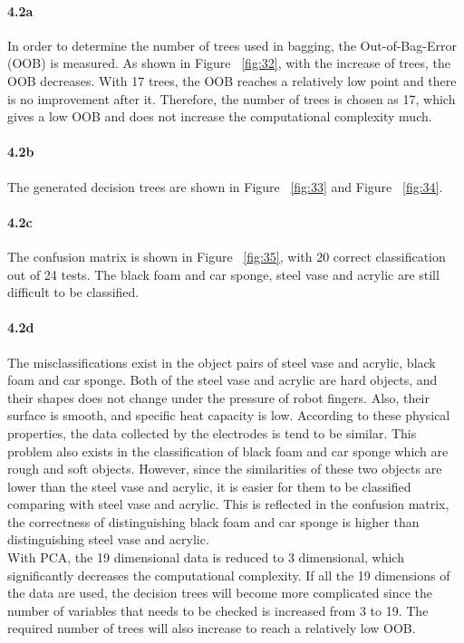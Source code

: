 \documentclass[10pt,twocolumn,letterpaper]{article}
\begin{document}
\paragraph{4.2a}
In order to determine the number of trees used in bagging, the Out-of-Bag-Error (OOB) is measured. As shown in Figure ~\ref{fig:32}, with the increase of trees, the OOB decreases. With 17 trees, the OOB reaches a relatively low point and there is no improvement after it. Therefore, the number of trees is chosen as 17, which gives a low OOB and does not increase the computational complexity much.

\paragraph{4.2b}
The generated decision trees are shown in Figure ~\ref{fig:33} and Figure ~\ref{fig:34}.

\paragraph{4.2c}
The confusion matrix is shown in Figure ~\ref{fig:35}, with 20 correct classification out of 24 tests. The black foam and car sponge, steel vase and acrylic are still difficult to be classified.

\paragraph{4.2d} The misclassifications exist in the object pairs of steel vase and acrylic, black foam and car sponge. Both of the steel vase and acrylic are hard objects, and their shapes does not change under the pressure of robot fingers. Also, their surface is smooth, and specific heat capacity is low. According to these physical properties, the data collected by the electrodes is tend to be similar. This problem also exists in the classification of black foam and car sponge which are rough and soft objects. However, since the similarities of these two objects are lower than the steel vase and acrylic, it is easier for them to be classified comparing with steel vase and acrylic. This is reflected in the confusion matrix, the correctness of distinguishing black foam and car sponge is higher than distinguishing steel vase and acrylic.\\

\noindent With PCA, the 19 dimensional data is reduced to 3 dimensional, which significantly decreases the computational complexity. If all the 19 dimensions of the data are used, the decision trees will become more complicated since the number of variables that needs to be checked is increased from 3 to 19. The required number of trees will also increase to reach a relatively low OOB.
\end{document}
